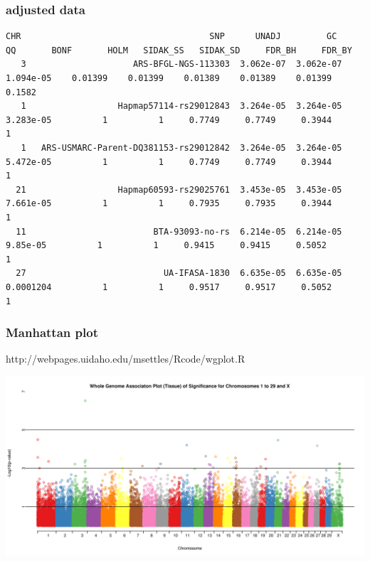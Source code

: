 \documentclass[pdf]{beamer}
\begin{document}
\begin{frame}[fragile]
\frametitle{adjusted data}
\begin{tiny}
\begin{verbatim}
CHR                                     SNP      UNADJ         GC         QQ       BONF       HOLM   SIDAK_SS   SIDAK_SD     FDR_BH     FDR_BY
   3                     ARS-BFGL-NGS-113303  3.062e-07  3.062e-07  1.094e-05    0.01399    0.01399    0.01389    0.01389    0.01399     0.1582 
   1                  Hapmap57114-rs29012843  3.264e-05  3.264e-05  3.283e-05          1          1     0.7749     0.7749     0.3944          1 
   1   ARS-USMARC-Parent-DQ381153-rs29012842  3.264e-05  3.264e-05  5.472e-05          1          1     0.7749     0.7749     0.3944          1 
  21                  Hapmap60593-rs29025761  3.453e-05  3.453e-05  7.661e-05          1          1     0.7935     0.7935     0.3944          1 
  11                         BTA-93093-no-rs  6.214e-05  6.214e-05   9.85e-05          1          1     0.9415     0.9415     0.5052          1 
  27                           UA-IFASA-1830  6.635e-05  6.635e-05  0.0001204          1          1     0.9517     0.9517     0.5052          1 
\end{verbatim}
\end{tiny}
\end{frame}

\begin{frame}
\frametitle{Manhattan plot}
http://webpages.uidaho.edu/msettles/Rcode/wgplot.R
\begin{center}
\includegraphics[scale=0.4]{Figures/wgaplotpaper.png} 
\end{center}
\end{frame}
\end{document}
